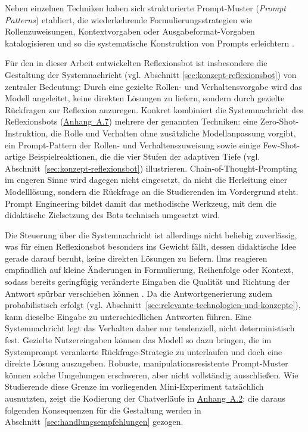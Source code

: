 Neben einzelnen Techniken haben sich strukturierte Prompt-Muster (\emph{Prompt Patterns}) etabliert,
die wiederkehrende Formulierungsstrategien wie Rollenzuweisungen, Kontextvorgaben oder
Ausgabeformat-Vorgaben katalogisieren und so die systematische Konstruktion von Prompts
erleichtern \cite{whitePromptPatternCatalog2023}.

Für den in dieser Arbeit entwickelten Reflexionsbot ist insbesondere die Gestaltung der
Systemnachricht (vgl. Abschnitt \ref{sec:konzept-reflexionsbot}) von zentraler
Bedeutung: Durch eine gezielte Rollen- und Verhaltensvorgabe wird das Modell angeleitet, keine
direkten Lösungen zu liefern, sondern durch gezielte Rückfragen zur Reflexion anzuregen. Konkret
kombiniert die Systemnachricht des Reflexionsbots (\hyperref[app:systemprompt]{Anhang~A.7}) mehrere der genannten Techniken: eine
Zero-Shot-Instruktion, die Rolle und Verhalten ohne zusätzliche Modellanpassung vorgibt, ein
Prompt-Pattern der Rollen- und Verhaltenszuweisung sowie einige Few-Shot-artige Beispielreaktionen,
die die vier Stufen der adaptiven Tiefe (vgl. Abschnitt~\ref{sec:konzept-reflexionsbot}) illustrieren.
Chain-of-Thought-Prompting im engeren Sinne wird dagegen nicht eingesetzt, da nicht die Herleitung
einer Modelllösung, sondern die Rückfrage an die Studierenden im Vordergrund steht. Prompt
Engineering bildet damit das methodische Werkzeug, mit dem die didaktische Zielsetzung des Bots
technisch umgesetzt wird.

Die Steuerung über die Systemnachricht ist allerdings nicht beliebig zuverlässig, was für einen
Reflexionsbot besonders ins Gewicht fällt, dessen didaktische Idee gerade darauf beruht, keine
direkten Lösungen zu liefern. \glspl{llm} reagieren empfindlich auf kleine Änderungen in Formulierung,
Reihenfolge oder Kontext, sodass bereits geringfügig veränderte Eingaben die Qualität und Richtung der
Antwort spürbar verschieben können \cite{sahooSystematicSurveyPrompt2025}. Da die Antwortgenerierung
zudem probabilistisch erfolgt (vgl. Abschnitt~\ref{sec:relevante-technologien-und-konzepte}), kann
dieselbe Eingabe zu unterschiedlichen Antworten führen. Eine Systemnachricht legt das Verhalten daher
nur tendenziell, nicht deterministisch fest. Gezielte Nutzereingaben können das Modell so dazu
bringen, die im Systemprompt verankerte Rückfrage-Strategie zu unterlaufen und doch eine direkte
Lösung auszugeben. Robuste, manipulationsresistente Prompt-Muster
\cite{whitePromptPatternCatalog2023} können solche Umgehungen erschweren, aber nicht vollständig
ausschließen. Wie Studierende diese Grenze im vorliegenden Mini-Experiment tatsächlich ausnutzten,
zeigt die Kodierung der Chatverläufe in \hyperref[app:kodierungstabelle]{Anhang~A.2}; die daraus
folgenden Konsequenzen für die Gestaltung werden in Abschnitt~\ref{sec:handlungsempfehlungen}
gezogen.

